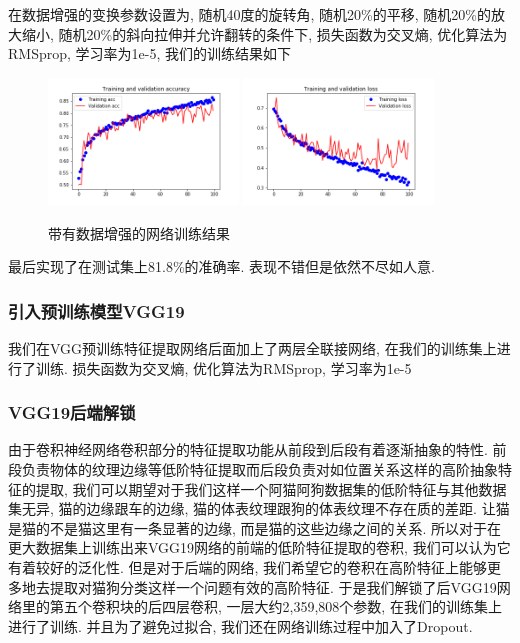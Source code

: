 \documentclass[lang=cn,11pt]{elegantpaper}
\begin{document}
在数据增强的变换参数设置为, 随机40度的旋转角, 随机20\%的平移, 随机20\%的放大缩小, 随机20\%的斜向拉伸并允许翻转的条件下, 损失函数为交叉熵, 优化算法为RMSprop, 学习率为1e-5, 我们的训练结果如下

\begin{figure}[hbt]
\centering
  \includegraphics[width=0.45\textwidth]{small_aug_1.png}
  \includegraphics[width=0.45\textwidth]{small_aug_2.png}
  \caption{带有数据增强的网络训练结果}
\end{figure}

最后实现了在测试集上81.8\%的准确率. 表现不错但是依然不尽如人意.


\subsubsection{引入预训练模型VGG19}

我们在VGG预训练特征提取网络后面加上了两层全联接网络, 在我们的训练集上进行了训练. 损失函数为交叉熵, 优化算法为RMSprop, 学习率为1e-5

\subsubsection{VGG19后端解锁}

由于卷积神经网络卷积部分的特征提取功能从前段到后段有着逐渐抽象的特性. 前段负责物体的纹理边缘等低阶特征提取而后段负责对如位置关系这样的高阶抽象特征的提取, 我们可以期望对于我们这样一个阿猫阿狗数据集的低阶特征与其他数据集无异, 猫的边缘跟车的边缘, 猫的体表纹理跟狗的体表纹理不存在质的差距. 让猫是猫的不是猫这里有一条显著的边缘, 而是猫的这些边缘之间的关系. 所以对于在更大数据集上训练出来VGG19网络的前端的低阶特征提取的卷积, 我们可以认为它有着较好的泛化性. 但是对于后端的网络, 我们希望它的卷积在高阶特征上能够更多地去提取对猫狗分类这样一个问题有效的高阶特征. 于是我们解锁了后VGG19网络里的第五个卷积块的后四层卷积, 一层大约2,359,808个参数, 在我们的训练集上进行了训练. 并且为了避免过拟合, 我们还在网络训练过程中加入了Dropout.
\end{document}
